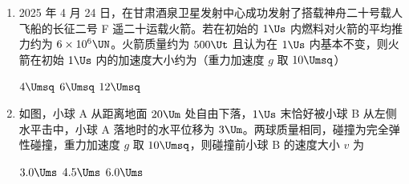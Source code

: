 \documentclass[\gkver]{gaokaozhenti}
\begin{document}
\begin{enumerate}
{B．结合 A 分析可知，若 $\sqrt{\frac{GM}{R}} < v < \sqrt{\frac{2GM}{R}}$，万有引力不足以提供小星球做匀速圆周运动所需要的向心力，小星球做离心运动，但又不能脱离恒星的引力范围，所以小星球做椭圆运动，而不是抛物线运动，故 B 错误；

C．若 $v = \sqrt{\frac{2GM}{R}}$，这是小星球脱离恒星引力束缚的临界速度，小星球将做抛物线运动，而不是椭圆运动，故 C 错误；

D．若 $v > \sqrt{\frac{2GM}{R}}$，小星球将脱离恒星引力束缚，做双曲线运动，不可能与恒星相撞，故 D 错误。

故选 A。
}

\item
2025 年 4 月 24 日，在甘肃酒泉卫星发射中心成功发射了搭载神舟二十号载人飞船的长征二号 F 遥二十运载火箭。若在初始的 $1 \Us$ 内燃料对火箭的平均推力约为 $6 \times 10^{6} \UN$。火箭质量约为 $500 \Ut$ 且认为在 $1 \Us$ 内基本不变，则火箭在初始 $1 \Us$ 内的加速度大小约为（重力加速度 $g$ 取 $10 \Umsq$）

\fourchoices[answer=A]
{$2 \Umsq$}
{$4 \Umsq$}
{$6 \Umsq$}
{$12 \Umsq$}


\item
如图，小球 A 从距离地面 $20 \Um$ 处自由下落，$1 \Us$ 末恰好被小球 B 从左侧水平击中，小球 A 落地时的水平位移为 $3 \Um$。两球质量相同，碰撞为完全弹性碰撞，重力加速度 $g$ 取 $10 \Umsq$，则碰撞前小球 B 的速度大小 $v$ 为

\onepicture[w=5.50cm]{}

\fourchoices[answer=B]
{$1.5 \Ums$}
{$3.0 \Ums$}
{$4.5 \Ums$}
{$6.0 \Ums$}

\end{enumerate}
\end{document}
